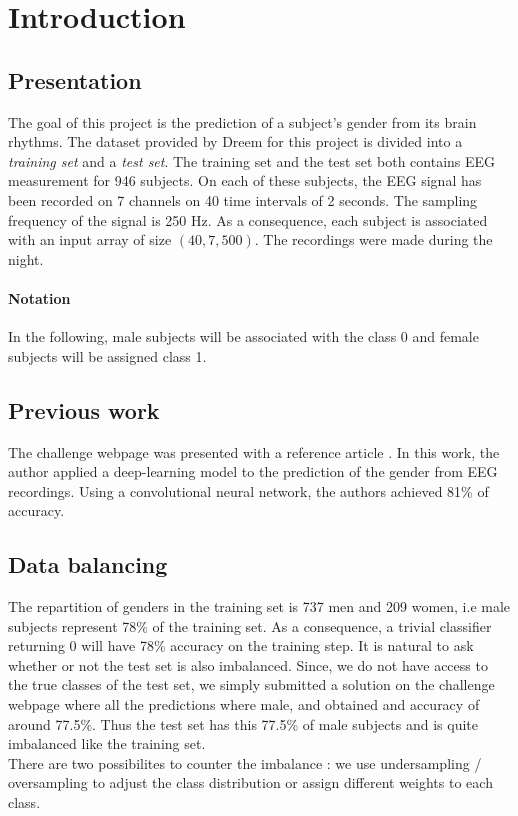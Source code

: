 \section{Introduction}

\subsection{Presentation}The goal of this project is the prediction of a subject's gender from its brain rhythms.
The dataset provided by Dreem for this project is divided into a \textit{training set} and a \textit{test set}. The training set and the test set both contains EEG measurement for 946 subjects. On each of these subjects, the EEG signal has been recorded on 7 channels on 40 time intervals of 2 seconds. The sampling frequency of the signal is 250 Hz. As a consequence, each subject is associated with an input array of size $(40, 7, 500)$. The recordings were made during the night.
\paragraph{Notation} In the following, male subjects will be associated with the class 0 and female subjects will be assigned class 1.

\subsection{Previous work}

The challenge webpage was presented with a reference article \cite{vanPutten2018}. In this work, the author applied a deep-learning model to the prediction of the gender from EEG recordings. Using a convolutional neural network, the authors achieved 81\% of accuracy. 

\subsection{Data balancing} The repartition of genders in the training set is 737 men and 209 women, i.e male subjects represent 78\% of the training set. As a consequence, a trivial classifier returning 0 will have 78\% accuracy on the training step. It is natural to ask whether or not the test set is also imbalanced. Since, we do not have access to the true classes of the test set, we simply submitted a solution on the challenge webpage where all the predictions where male, and obtained and accuracy of around 77.5\%. Thus the test set has this 77.5\% of male subjects and is quite imbalanced like the training set. \\
There are two possibilites to counter the imbalance : we use undersampling / oversampling to adjust the class distribution or assign different weights to each class.

